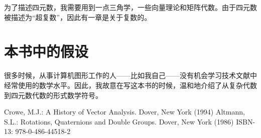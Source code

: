 为了描述四元数，我需要用到一点三角学，一些向量理论和矩阵代数。由于四元数被描述为“超复数”，因此有一章是关于复数的。


\section{本书中的假设}
很多时候，从事计算机图形工作的人——比如我自己——没有机会学习技术文献中经常使用的数学水平。因此，我故意在写这本书的时候，温和地介绍了从复杂代数到四元数代数的形式数学符号。


\begin{thebibliography}{99}
     Crowe, M.J.: A History of Vector Analysis. Dover, New York (1994)
    Altmann, S.L.: Rotations, Quaternions and Double Groups. Dover, New York (1986) ISBN-13:
    978-0-486-44518-2
\end{thebibliography}